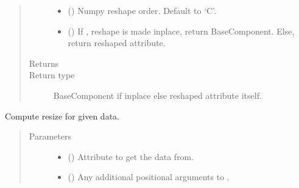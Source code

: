 \documentclass[letterpaper,10pt,english]{sphinxmanual}
\begin{document}
\begin{fulllineitems}
\begin{fulllineitems}
\begin{quote}
\begin{description}
\begin{itemize}
\item {} 
 () \textendash{} Numpy reshape order. Default to ‘C’.

\item {} 
 () \textendash{} If , reshape is made inplace, return BaseComponent.
Else, return reshaped attribute.

\end{itemize}

\item[{Returns}] \leavevmode
{}

\item[{Return type}] \leavevmode
BaseComponent if inplace else reshaped attribute itself.

\end{description}\end{quote}

\end{fulllineitems}


\begin{fulllineitems}
\label{\detokenize{api/states:geology.src.States.resize}}
Compute resize for given data.
\begin{quote}\begin{description}
\item[{Parameters}] \leavevmode\begin{itemize}
\item {} 
 (\sphinxstyleliteralemphasis{\sphinxupquote{, }}) \textendash{} Attribute to get the data from.

\item {} 
 () \textendash{} Any additional positional arguments to .


\end{itemize}
\end{description}
\end{quote}
\end{fulllineitems}
\end{fulllineitems}
\end{document}

